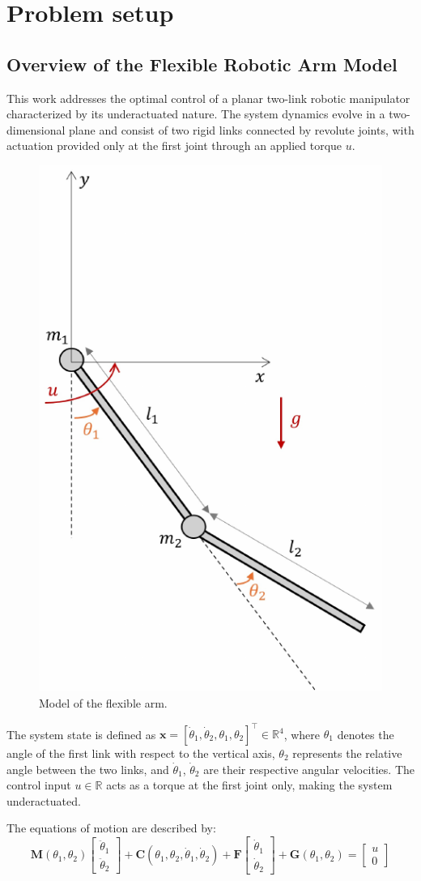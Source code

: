 \chapter{Problem setup}
\section{Overview of the Flexible Robotic Arm Model}

This work addresses the optimal control of a planar two-link robotic manipulator characterized by its underactuated nature. The system dynamics evolve in a two-dimensional plane and consist of two rigid links connected by revolute joints, with actuation provided only at the first joint through an applied torque $u$.

\begin{figure}[htb]
    \centering
    \includegraphics[width=0.35\linewidth]{img/0-task0/system.pdf}
    \caption{Model of the flexible arm.} %
    \label{fig:flexible-arm}
\end{figure}

The system state is defined as $\mathbf{x} = [\dot{\theta}_1, \dot{\theta}_2, \theta_1, \theta_2]^\top \in \mathbb{R}^4$, where $\theta_1$ denotes the angle of the first link with respect to the vertical axis, $\theta_2$ represents the relative angle between the two links, and $\dot{\theta}_1$, $\dot{\theta}_2$ are their respective angular velocities. The control input $u \in \mathbb{R}$ acts as a torque at the first joint only, making the system underactuated.

The equations of motion are described by:
\begin{equation}
\mathbf{M}(\theta_1, \theta_2)\begin{bmatrix}\ddot{\theta}_1\\ \ddot{\theta}_2\end{bmatrix} + 
\mathbf{C}(\theta_1, \theta_2, \dot{\theta}_1, \dot{\theta}_2) + 
\mathbf{F}\begin{bmatrix}\dot{\theta}_1\\ \dot{\theta}_2\end{bmatrix} + 
\mathbf{G}(\theta_1, \theta_2) = \begin{bmatrix}u\\ 0\end{bmatrix}
\label{eq:dynamics}
\end{equation}

